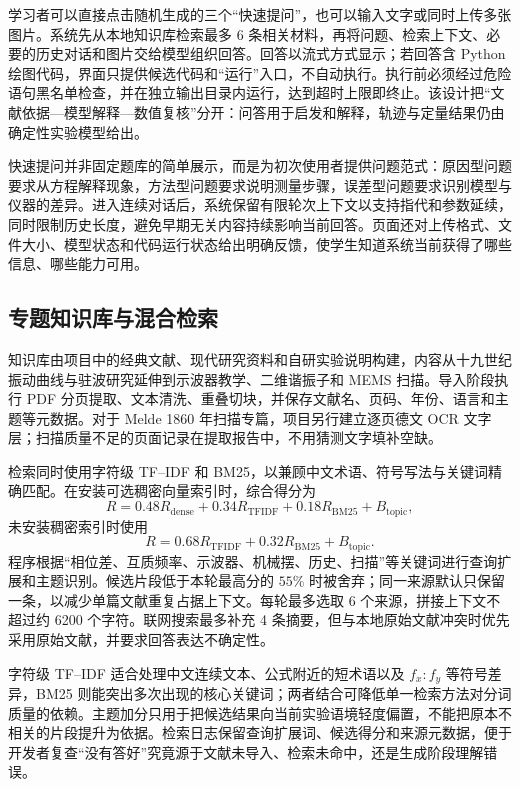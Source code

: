 \documentclass[UTF8,a4paper,zihao=-4]{ctexart}
\begin{document}
学习者可以直接点击随机生成的三个“快速提问”，也可以输入文字或同时上传多张图片。系统先从本地知识库检索最多 6 条相关材料，再将问题、检索上下文、必要的历史对话和图片交给模型组织回答。回答以流式方式显示；若回答含 Python 绘图代码，界面只提供候选代码和“运行”入口，不自动执行。执行前必须经过危险语句黑名单检查，并在独立输出目录内运行，达到超时上限即终止。该设计把“文献依据—模型解释—数值复核”分开：问答用于启发和解释，轨迹与定量结果仍由确定性实验模型给出。

快速提问并非固定题库的简单展示，而是为初次使用者提供问题范式：原因型问题要求从方程解释现象，方法型问题要求说明测量步骤，误差型问题要求识别模型与仪器的差异。进入连续对话后，系统保留有限轮次上下文以支持指代和参数延续，同时限制历史长度，避免早期无关内容持续影响当前回答。页面还对上传格式、文件大小、模型状态和代码运行状态给出明确反馈，使学生知道系统当前获得了哪些信息、哪些能力可用。

\subsection{专题知识库与混合检索}
知识库由项目中的经典文献、现代研究资料和自研实验说明构建，内容从十九世纪振动曲线与驻波研究延伸到示波器教学、二维谐振子和 MEMS 扫描\cite{cena2014,hogan2019,wang2020,birla2020,huang2025,terquem1878,melde1860}。导入阶段执行 PDF 分页提取、文本清洗、重叠切块，并保存文献名、页码、年份、语言和主题等元数据。对于 Melde 1860 年扫描专篇，项目另行建立逐页德文 OCR 文字层；扫描质量不足的页面记录在提取报告中，不用猜测文字填补空缺。

检索同时使用字符级 TF--IDF 和 BM25，以兼顾中文术语、符号写法与关键词精确匹配。在安装可选稠密向量索引时，综合得分为
\begin{equation}
R=0.48R_{\mathrm{dense}}+0.34R_{\mathrm{TFIDF}}+0.18R_{\mathrm{BM25}}+B_{\mathrm{topic}},
\end{equation}
未安装稠密索引时使用
\begin{equation}
R=0.68R_{\mathrm{TFIDF}}+0.32R_{\mathrm{BM25}}+B_{\mathrm{topic}}.
\end{equation}
程序根据“相位差、互质频率、示波器、机械摆、历史、扫描”等关键词进行查询扩展和主题识别。候选片段低于本轮最高分的 $55\%$ 时被舍弃；同一来源默认只保留一条，以减少单篇文献重复占据上下文。每轮最多选取 6 个来源，拼接上下文不超过约 6200 个字符。联网搜索最多补充 4 条摘要，但与本地原始文献冲突时优先采用原始文献，并要求回答表达不确定性。

字符级 TF--IDF 适合处理中文连续文本、公式附近的短术语以及 $f_x:f_y$ 等符号差异，BM25 则能突出多次出现的核心关键词；两者结合可降低单一检索方法对分词质量的依赖。主题加分只用于把候选结果向当前实验语境轻度偏置，不能把原本不相关的片段提升为依据。检索日志保留查询扩展词、候选得分和来源元数据，便于开发者复查“没有答好”究竟源于文献未导入、检索未命中，还是生成阶段理解错误。
\end{document}
